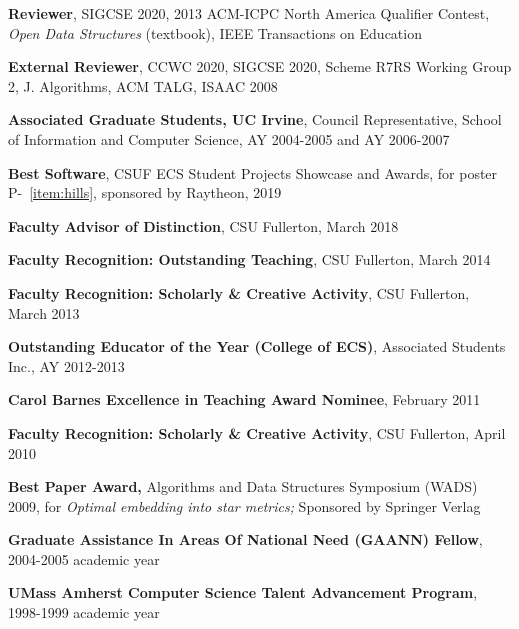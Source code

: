 \documentclass[11pt]{letter}
\begin{document}
\textbf{Reviewer}, SIGCSE 2020, 2013 ACM-ICPC North America Qualifier Contest, \emph{Open Data Structures} (textbook), IEEE Transactions on Education

\textbf{External Reviewer}, CCWC 2020, SIGCSE 2020, Scheme R7RS Working Group 2, J. Algorithms, ACM TALG, ISAAC 2008



\textbf{Associated Graduate Students, UC Irvine},  Council Representative, School of Information and Computer Science, AY 2004-2005 and AY 2006-2007 


\textbf{Best Software}, CSUF ECS Student Projects Showcase and Awards, for
  poster P-~\ref{item:hills}, sponsored by Raytheon, 2019

\textbf{Faculty Advisor of Distinction}, CSU Fullerton, March 2018

\textbf{Faculty Recognition: Outstanding Teaching}, CSU Fullerton, March 2014

\textbf{Faculty Recognition: Scholarly \& Creative Activity}, CSU Fullerton, March 2013

\textbf{Outstanding Educator of the Year (College of ECS)}, Associated Students Inc., AY 2012-2013

\textbf{Carol Barnes Excellence in Teaching Award Nominee}, February 2011

\textbf{Faculty Recognition: Scholarly \& Creative Activity}, CSU Fullerton, April 2010

\textbf{Best Paper Award,} Algorithms and Data Structures Symposium (WADS) 2009, for \emph{Optimal embedding into star metrics;} Sponsored by Springer Verlag

\textbf{Graduate Assistance In Areas Of National Need (GAANN) Fellow}, 2004-2005 academic year

\textbf{UMass Amherst Computer Science Talent Advancement Program}, 1998-1999 academic year
\end{document}
